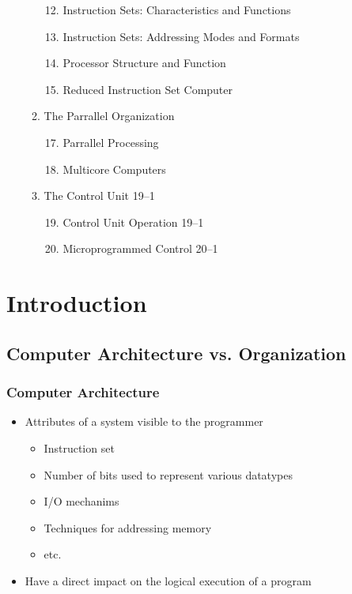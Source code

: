 \begin{itemize}
\begin{enumerate}
\begin{enumerate}[label = Ch. \arabic*:, labelindent=0pt, itemindent=1em, leftmargin=2em]
            \setcounter{enumii}{11}
            \item Instruction Sets: Characteristics and Functions
            \item Instruction Sets: Addressing Modes and Formats
            \item Processor Structure and Function
            \item Reduced Instruction Set Computer
        \end{enumerate}
        \item The Parrallel Organization
        \begin{enumerate}[label = Ch. \arabic*:, labelindent=0pt, itemindent=1em, leftmargin=2em]
            \setcounter{enumii}{16}
            \item Parrallel Processing
            \item Multicore Computers
        \end{enumerate}
        \item The Control Unit 19--1
        \begin{enumerate}[label = Ch. \arabic*:, labelindent=0pt, itemindent=1em, leftmargin=2em]
            \setcounter{enumii}{18}
            \item Control Unit Operation 19--1
            \item Microprogrammed Control 20--1
        \end{enumerate}
    \end{enumerate}
\end{itemize}


\chapter{Introduction}

\section{Computer Architecture vs. Organization}

\subsection*{Computer Architecture}

\begin{itemize}
    \item Attributes of a system visible to the programmer
    \begin{itemize}
        \item Instruction set
        \item Number of bits used to represent various datatypes
        \item I/O mechanims
        \item Techniques for addressing memory
        \item etc.
    \end{itemize}
    \item Have a direct impact on the logical execution of a program
\end{itemize}

